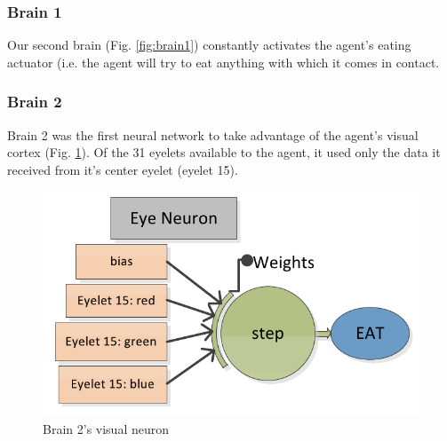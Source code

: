 \subsubsection{Brain 1}

Our second brain (Fig. \ref{fig:brain1}) constantly activates the agent's 
eating actuator (i.e. the agent will try to eat anything with which it comes
in contact.

\subsubsection{Brain 2}

Brain 2 was the first neural network to take advantage of the agent's visual
cortex (Fig. \ref{fig:brain2}). Of the 31 eyelets available to the agent, it 
used only the data it received from it's center eyelet (eyelet 15).


\begin{figure}
\begin{center}
  \includegraphics[scale=.3]{img/brain2.png}
  \caption{Brain 2's visual neuron}
  \label{fig:brain2}
\end{center}
\end{figure}
